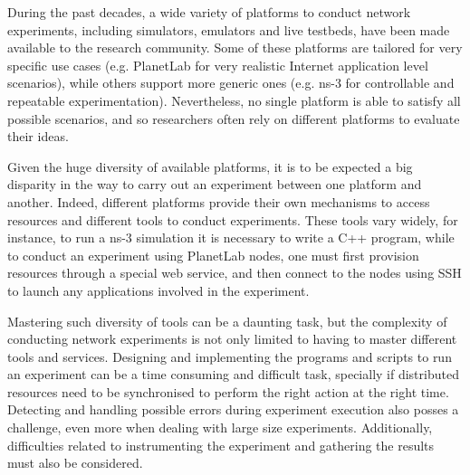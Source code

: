 %
%
%
%
%
%

During the past decades, a wide variety of platforms to conduct network
experiments, including simulators, emulators and live testbeds,
have been made available to the research community.
Some of these platforms are tailored for very specific use cases (e.g.
PlanetLab for very realistic Internet application level scenarios), 
while others support more generic ones (e.g. ns-3 for controllable 
and repeatable experimentation). Nevertheless, no single platform is 
able to satisfy all possible scenarios, and so researchers often rely 
on different platforms to evaluate their ideas.

Given the huge diversity of available platforms, it is to be expected a
big disparity in the way to carry out an experiment between one platform and 
another. Indeed, different platforms provide their own mechanisms to 
access resources and different tools to conduct experiments. 
These tools vary widely, for instance, to run a ns-3 simulation it is 
necessary to write a C++ program, while to conduct an experiment using
PlanetLab nodes, one must first provision resources through a special web
service, and then connect to the nodes using SSH to launch any applications
involved in the experiment.

Mastering such diversity of tools can be a daunting task, 
but the complexity of conducting network experiments is not only limited 
to having to master different tools and services.
Designing and implementing the programs and scripts to run an experiment
can be a time consuming and difficult task, specially if distributed
resources need to be synchronised to perform the right action at the
right time. Detecting and handling possible errors during experiment
execution also posses a challenge, even more when dealing with large size
experiments. Additionally, difficulties related to instrumenting the 
experiment and gathering the results must also be considered.

